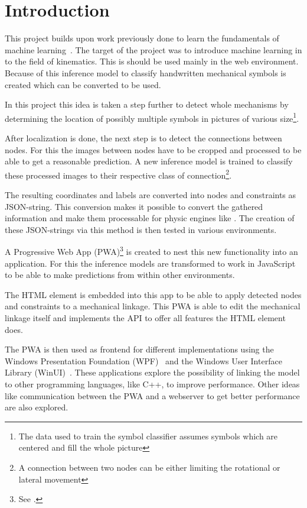 \section{Introduction}

This project builds upon work previously done to learn the fundamentals of machine learning~\cite{Lawrence2020}.
The target of the project was to introduce machine learning in to the field of kinematics.
This is should be used mainly in the web environment.
Because of this inference model to classify handwritten mechanical symbols is created which can be converted to be used.

In this project this idea is taken a step further to detect whole mechanisms by determining the location of possibly multiple symbols in pictures of various size\footnote{The data used to train the symbol classifier assumes symbols which are centered and fill the whole picture}.

After localization is done, the next step is to detect the connections between nodes.
For this the images between nodes have to be cropped and processed to be able to get a reasonable prediction.
A new inference model is trained to classify these processed images to their respective class of connection\footnote{A connection between two nodes can be either limiting the rotational or lateral movement}.

The resulting coordinates and labels are converted into  nodes and constraints as JSON-string.
This conversion makes it possible to convert the gathered information and make them processable for physic engines like .
The creation of these JSON-strings via this method is then tested in various environments.

A Progressive Web App (PWA)\footnote{See .} is created to nest this new functionality into an application.
For this the inference models are transformed to work in JavaScript to be able to make predictions from within other environments.

The  HTML element is embedded into this app to be able to apply detected nodes and constraints to a mechanical linkage.
This PWA is able to edit the mechanical linkage itself and implements the  API to offer all features the  HTML element does.

The PWA is then used as frontend for different implementations using the Windows Presentation Foundation (WPF)~\cite{Microsoft2021} and the Windows User Interface Library (WinUI)~\cite{Microsoft2021a}.
These applications explore the possibility of linking the model to other programming languages, like C++, to improve performance.
Other ideas like communication between the PWA and a webserver to get better performance are also explored.
